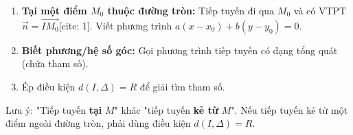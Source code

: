 \begin{enumerate}
\item \textbf{Tại một điểm $M_0$ thuộc đường tròn:} Tiếp tuyến đi qua $M_0$ và có VTPT $\overrightarrow{n} = \overrightarrow{IM_0}$[cite: 1]. Viết phương trình $a(x-x_0) + b(y-y_0) = 0$.
\item \textbf{Biết phương/hệ số góc:} Gọi phương trình tiếp tuyến có dạng tổng quát (chứa tham số).
\item Ép điều kiện $d(I, \Delta) = R$ để giải tìm tham số.
\end{enumerate}
Lưu ý: "Tiếp tuyến \textbf{tại} $M$" khác "tiếp tuyến \textbf{kẻ từ} $M$". Nếu tiếp tuyến kẻ từ một điểm ngoài đường tròn, phải dùng điều kiện $d(I, \Delta) = R$.
